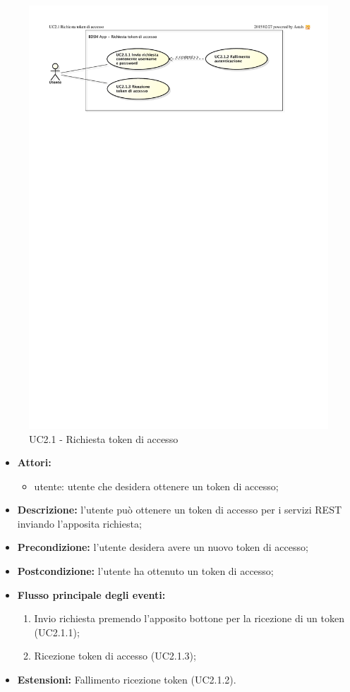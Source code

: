 \begin{figure}[htbp]
	\centering
	\centerline{\includegraphics{./images/UC2_1.pdf}}
	\caption{UC2.1 - Richiesta token di accesso}
\end{figure}

\begin{itemize}
	\item \textbf{Attori:}
	\begin{itemize}
		\item utente: utente che desidera ottenere un token di accesso;
	\end{itemize}
	\item \textbf{Descrizione:} l'utente può ottenere un token di accesso per i servizi REST inviando l'apposita richiesta;
	\item \textbf{Precondizione:} l'utente desidera avere un nuovo token di accesso;
	\item \textbf{Postcondizione:} l'utente ha ottenuto un token di accesso;
	\item \textbf{Flusso principale degli eventi:}
	\begin{enumerate}
		\item Invio richiesta premendo l'apposito bottone per la ricezione di un token (UC2.1.1);
		\item Ricezione token di accesso (UC2.1.3);
	\end{enumerate}
	\item \textbf{Estensioni:} Fallimento ricezione token (UC2.1.2).
\end{itemize}


